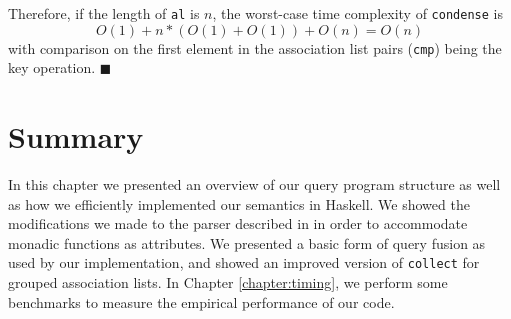 \documentclass[../main.tex]{subfiles}
\begin{document}
Therefore, if the length of \texttt{al} is $n$, the worst-case time complexity of \texttt{condense} is \[O(1) + n*(O(1) + O(1)) + O(n) = O(n)\] with comparison on the first element in the association list pairs (\texttt{cmp}) being the key operation.
$\blacksquare$



\section{Summary}

In this chapter we presented an overview of our query program structure as well as how we efficiently implemented our semantics in Haskell.
We showed the modifications we made to the parser described in \cite{frosthafiz2008} in order to accommodate monadic functions as attributes.
We presented a basic form of query fusion as used by our implementation, and showed an improved version of \texttt{collect} for
grouped association lists.  In Chapter \ref{chapter:timing}, we perform some benchmarks to measure the empirical performance of our code.
\end{document}
